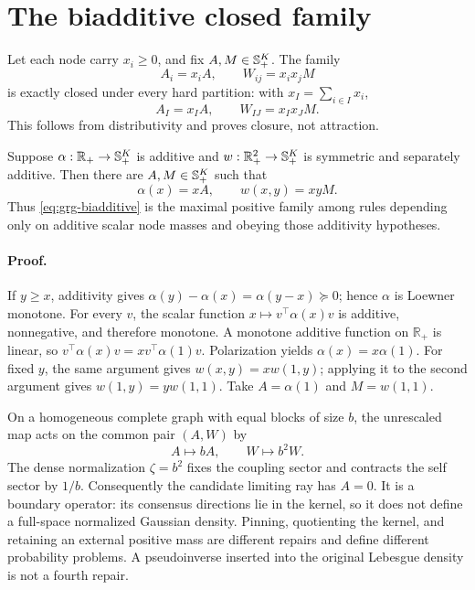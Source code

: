 \section{The biadditive closed family}
\label{sec:grg-biadditive}

Let each node carry \(x_i\geq0\), and fix \(A,M\in\mathbb S_{+}^K\).  The family
\begin{equation}
A_i=x_iA,\qquad W_{ij}=x_ix_jM
\label{eq:grg-biadditive}
\end{equation}
is exactly closed under every hard partition: with
\(x_I=\sum_{i\in I}x_i\),
\begin{equation}
A_I=x_IA,\qquad W_{IJ}=x_Ix_JM.
\label{eq:grg-biadditive-coarse}
\end{equation}
This follows from distributivity and proves closure, not attraction.

Suppose
\(\alpha:\mathbb R_+\to\mathbb S_{+}^K\) is additive and
\(w:\mathbb R_+^2\to\mathbb S_{+}^K\) is symmetric and separately additive.
Then there are \(A,M\in\mathbb S_{+}^K\) such that
\begin{equation}
\alpha(x)=xA,\qquad w(x,y)=xyM.
\label{eq:grg-additive-classification}
\end{equation}
Thus \eqref{eq:grg-biadditive} is the maximal positive family among rules
depending only on additive scalar node masses and obeying those additivity
hypotheses. 

\paragraph{Proof.}
If \(y\geq x\), additivity gives
\(\alpha(y)-\alpha(x)=\alpha(y-x)\succeq0\); hence \(\alpha\) is Loewner
monotone.  For every \(v\), the scalar function
\(x\mapsto v^\top\alpha(x)v\) is additive, nonnegative, and therefore
monotone.  A monotone additive function on \(\mathbb R_+\) is linear, so
\(v^\top\alpha(x)v=xv^\top\alpha(1)v\).  Polarization yields
\(\alpha(x)=x\alpha(1)\).  For fixed \(y\), the same argument gives
\(w(x,y)=xw(1,y)\); applying it to the second argument gives
\(w(1,y)=yw(1,1)\).  Take \(A=\alpha(1)\) and \(M=w(1,1)\).

On a homogeneous complete graph with equal blocks of size \(b\), the
unrescaled map acts on the common pair \((A,W)\) by
\begin{equation}
A\longmapsto bA,\qquad W\longmapsto b^2W.
\label{eq:grg-homogeneous-map}
\end{equation}
The dense normalization \(\zeta=b^2\) fixes the coupling sector and contracts
the self sector by \(1/b\).  Consequently the candidate limiting ray has
\(A=0\).  It is a boundary operator: its consensus directions lie in the
kernel, so it does not define a full-space normalized Gaussian density.
Pinning, quotienting the kernel, and retaining an external positive mass are
different repairs and define different probability problems.  A
pseudoinverse inserted into the original Lebesgue density is not a fourth
repair.

